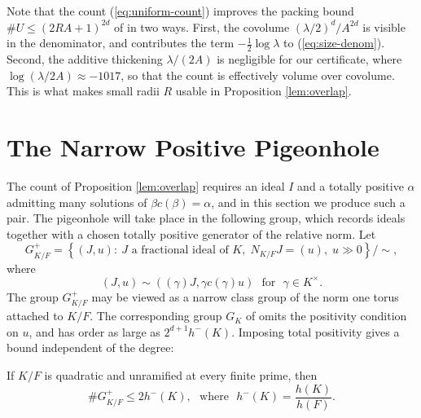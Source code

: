 Note that the count (\ref{eq:uniform-count}) improves the packing bound $\#U\leq(2RA+1)^{2d}$ of \cite[Lemma 2]{Sawin} in two ways.  First, the covolume $(\lambda/2)^d/A^{2d}$ is visible in the denominator, and contributes the term $-\frac12\log\lambda$ to (\ref{eq:size-denom}).  Second, the additive thickening $\lambda/(2A)$ is negligible for our certificate, where $\log(\lambda/2A)\approx-1017$, so that the count is effectively volume over covolume.  This is what makes small radii $R$ usable in Proposition \ref{lem:overlap}.

\section{The Narrow Positive Pigeonhole}\label{sec:pigeonhole}

The count of Proposition \ref{lem:overlap} requires an ideal $I$ and a totally positive $\alpha$ admitting many solutions of $\beta c(\beta)=\alpha$, and in this section we produce such a pair.  The pigeonhole will take place in the following group, which records ideals together with a chosen totally positive generator of the relative norm.  Let
\[
G_{K/F}^+=\left\{(J,u):\ J\text{ a fractional ideal of }K,\;N_{K/F}J=(u),\;u\gg0\right\}/\sim,
\]
where
\[
   (J,u)\sim ((\gamma)J,\gamma c(\gamma)u)\ \ \ \text{for}\ \ \ \gamma\in K^\times.
\]
The group $G^+_{K/F}$ may be viewed as a narrow class group of the norm one torus attached to $K/F$.  The corresponding group $G_K$ of \cite[Lemma 6]{Sawin} omits the positivity condition on $u$, and has order as large as $2^{d+1}h^-(K)$.  Imposing total positivity gives a bound independent of the degree:

\begin{lemma}\label{lem:narrow}
If $K/F$ is quadratic and unramified at every finite prime, then
\[
   \#G_{K/F}^+\leq 2h^-(K),
   \ \ \ \text{where}\ \ \ h^-(K)=\frac{h(K)}{h(F)}.
\]
\end{lemma}

